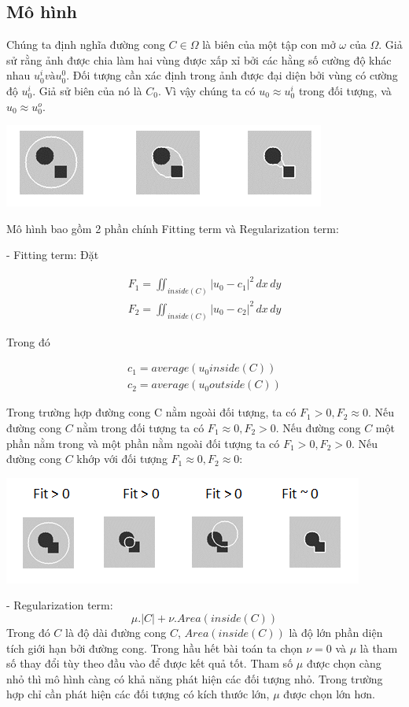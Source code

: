 \documentclass[12pt,oneside,a4]{report}
\begin{document}
\subsection{Mô hình}
Chúng ta định nghĩa đường cong $C\in \Omega$ là biên của một tập con mở $\omega$ của $\Omega$. Giả sử rằng ảnh được chia làm hai vùng được xấp xỉ bởi các hằng số cường độ khác nhau $u_0^i và u_0^0$. Đối tượng cần xác định trong ảnh được đại diện bởi vùng có cường độ $u_0^i$. Giả sử biên của nó là $C_0$. Vì vậy chúng ta có $u_0\approx u_0^i$ trong đối tượng, và $u_0\approx u_0^o$.
\begin{center}
\includegraphics[scale=1]{figure/ytuong.png}
\end{center}
Mô hình bao gồm 2 phần chính Fitting term và Regularization term: 

- Fitting term: Đặt

\begin{center}
\begin{align}
F_1=\iint_{inside(C)} |u_0-c_1|^2 \,dx\,dy\\
F_2=\iint_{inside(C)} |u_0-c_2|^2 \,dx\,dy
\end{align}
\end{center}
Trong đó
\begin{center}
\begin{align}
c_1=average(u_0 inside(C))\\
c_2=average(u_0 outside(C))
\end{align}
\end{center} 
Trong trường hợp đường cong C nằm ngoài đối tượng, ta có $F_1>0, F_2\approx 0$. Nếu đường cong $C$ nằm trong đối tượng ta có $F_1 \approx0, F_2> 0$. Nếu đường cong $C$ một phần nằm trong và một phần nằm ngoài đối tượng ta có $F_1>0, F_2> 0$. Nếu đường cong $C$ khớp với đối tượng $F_1 \approx 0, F_2\approx 0$:
\begin{center}
\includegraphics[scale=1]{figure/fitting.png}
\end{center}
- Regularization term:
\begin{equation}
\mu .|C|+\nu .Area(inside(C))
\end{equation}
Trong đó $C$ là độ dài đường cong $C$, $Area(inside(C))$ là độ lớn phần diện tích giới hạn bởi đường cong. Trong hầu hết bài toán ta chọn $\nu=0$ và $\mu$ là tham số thay đổi tùy theo đầu vào để được kết quả tốt. Tham số $\mu $ được chọn càng nhỏ thì mô hình càng có khả năng phát hiện các đối tượng nhỏ. Trong trường hợp chỉ cần phát hiện các đối tượng có kích thước lớn, $\mu$ được chọn lớn hơn.\\
\end{document}
